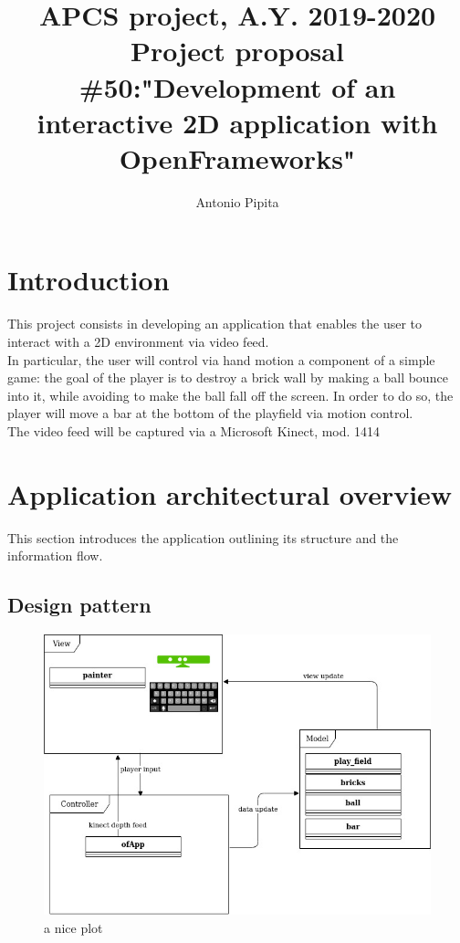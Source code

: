 \documentclass[]{article}
\title{APCS project, A.Y. 2019-2020\\Project proposal \#50:"Development of an interactive 2D application with  OpenFrameworks"}
\author{Antonio Pipita}
\begin{document}
\maketitle
\newpage
\tableofcontents
\newpage
\section{Introduction}
This project consists in developing an application that enables the user to interact with a 2D environment via video feed.\\
In particular, the user will control via hand motion a component of a simple game: the goal of the player is to destroy a brick wall by making a ball bounce into it, while avoiding to make the ball fall off the screen. In order to do so, the player will move a bar at the bottom of the playfield via motion control.\\
The video feed will be captured via a Microsoft Kinect, mod. 1414\\
\section{Application architectural overview}
This section introduces the application outlining its structure and the information flow.
\subsection{Design pattern}
\begin{figure}[h!]
    \centering
    \includegraphics[width=\textwidth]{MVC_mod.jpg}
    \caption{a nice plot}
    \label{fig:MVC}
\end{figure}
\end{document}
